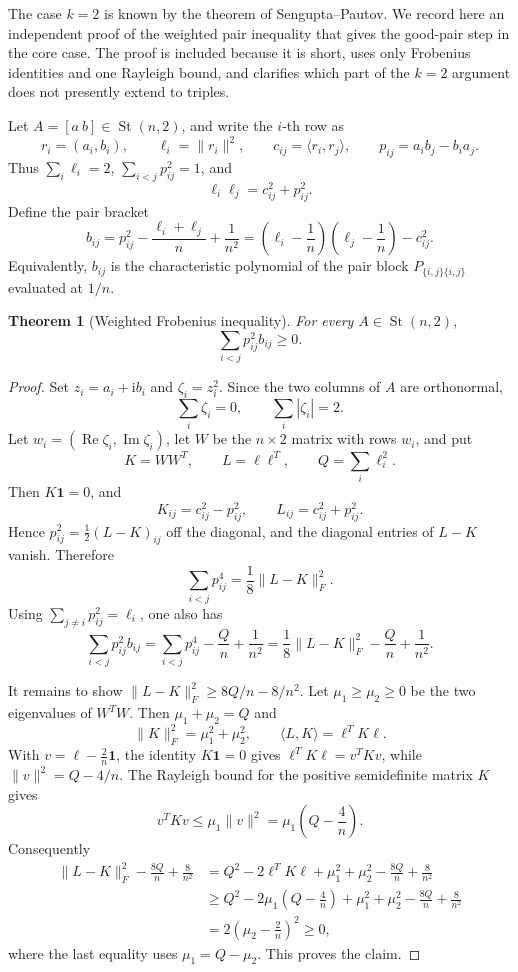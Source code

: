 \documentclass[11pt]{article}
\numberwithin{equation}{section}
\newtheorem{theorem}{Theorem}[section]
\theoremstyle{definition}
\newcommand{\St}{\operatorname{St}}
\begin{document}
The case \(k=2\) is known by the theorem of Sengupta--Pautov.  We record here
an independent proof of the weighted pair inequality that gives the good-pair
step in the core case.  The proof is included because it is short, uses only
Frobenius identities and one Rayleigh bound, and clarifies which part of the
\(k=2\) argument does not presently extend to triples.

Let \(A=[a\ b]\in\St(n,2)\), and write the \(i\)-th row as
\[
  r_i=(a_i,b_i),\qquad
  \ell_i=\|r_i\|^2,\qquad
  c_{ij}=\langle r_i,r_j\rangle,\qquad
  p_{ij}=a_ib_j-b_ia_j.
\]
Thus \(\sum_i\ell_i=2\), \(\sum_{i<j}p_{ij}^2=1\), and
\[
  \ell_i\ell_j=c_{ij}^2+p_{ij}^2.
\]
Define the pair bracket
\[
  b_{ij}
  =p_{ij}^2-\frac{\ell_i+\ell_j}{n}+\frac1{n^2}
  =\left(\ell_i-\frac1n\right)\left(\ell_j-\frac1n\right)-c_{ij}^2.
\]
Equivalently, \(b_{ij}\) is the characteristic polynomial of the pair block
\(P_{\{i,j\}\{i,j\}}\) evaluated at \(1/n\).

\begin{theorem}[Weighted Frobenius inequality]\label{thm:k2-frobenius}
For every \(A\in\St(n,2)\),
\[
  \sum_{i<j}p_{ij}^2 b_{ij}\ge0.
\]
\end{theorem}

\begin{proof}
Set \(z_i=a_i+\mathrm i b_i\) and \(\zeta_i=z_i^2\).  Since the two columns of
\(A\) are orthonormal,
\[
  \sum_i\zeta_i=0,\qquad \sum_i|\zeta_i|=2.
\]
Let \(w_i=(\operatorname{Re}\zeta_i,\operatorname{Im}\zeta_i)\), let \(W\) be
the \(n\times2\) matrix with rows \(w_i\), and put
\[
  K=WW^T,\qquad L=\ell\ell^T,\qquad Q=\sum_i\ell_i^2.
\]
Then \(K\mathbf 1=0\), and
\[
  K_{ij}=c_{ij}^2-p_{ij}^2,\qquad
  L_{ij}=c_{ij}^2+p_{ij}^2.
\]
Hence \(p_{ij}^2=\frac12(L-K)_{ij}\) off the diagonal, and the diagonal entries
of \(L-K\) vanish.  Therefore
\[
  \sum_{i<j}p_{ij}^4=\frac18\|L-K\|_F^2.
\]
Using \(\sum_{j\ne i}p_{ij}^2=\ell_i\), one also has
\[
  \sum_{i<j}p_{ij}^2 b_{ij}
  =\sum_{i<j}p_{ij}^4-\frac Qn+\frac1{n^2}
  =\frac18\|L-K\|_F^2-\frac Qn+\frac1{n^2}.
\]

It remains to show \(\|L-K\|_F^2\ge 8Q/n-8/n^2\).  Let
\(\mu_1\ge\mu_2\ge0\) be the two eigenvalues of \(W^TW\).  Then
\(\mu_1+\mu_2=Q\) and
\[
  \|K\|_F^2=\mu_1^2+\mu_2^2,\qquad
  \langle L,K\rangle=\ell^TK\ell.
\]
With \(v=\ell-\frac2n\mathbf1\), the identity \(K\mathbf1=0\) gives
\(\ell^TK\ell=v^TKv\), while \(\|v\|^2=Q-4/n\).  The Rayleigh bound for the
positive semidefinite matrix \(K\) gives
\[
  v^TKv\le\mu_1\|v\|^2=\mu_1\left(Q-\frac4n\right).
\]
Consequently
\[
\begin{aligned}
  \|L-K\|_F^2-\frac{8Q}{n}+\frac8{n^2}
  &=
  Q^2-2\ell^TK\ell+\mu_1^2+\mu_2^2-\frac{8Q}{n}+\frac8{n^2}  \\
  &\ge
  Q^2-2\mu_1\left(Q-\frac4n\right)+\mu_1^2+\mu_2^2
  -\frac{8Q}{n}+\frac8{n^2}  \\
  &=2\left(\mu_2-\frac2n\right)^2\ge0,
\end{aligned}
\]
where the last equality uses \(\mu_1=Q-\mu_2\).  This proves the claim.
\end{proof}
\end{document}
